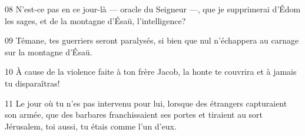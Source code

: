 
08 N’est-ce pas en ce jour-là --- oracle du Seigneur ---, que je supprimerai d’Édom les sages, et de la montagne d’Ésaü, l’intelligence?

09 Témane, tes guerriers seront paralysés, si bien que nul n’échappera au carnage sur la montagne d’Ésaü.

10 À cause de la violence faite à ton frère Jacob, la honte te couvrira et à jamais tu disparaîtras!

11 Le jour où tu n’es pas intervenu pour lui, lorsque des étrangers capturaient son armée, que des barbares franchissaient ses portes et tiraient au sort Jérusalem, toi aussi, tu étais comme l’un d’eux.